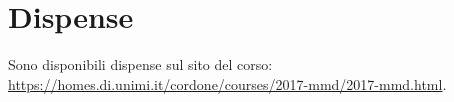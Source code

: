 \documentclass[\main/main.tex]{subfiles}
\begin{document}
\section{Dispense}
Sono disponibili dispense sul sito del corso: \url{https://homes.di.unimi.it/cordone/courses/2017-mmd/2017-mmd.html}.
\end{document}
